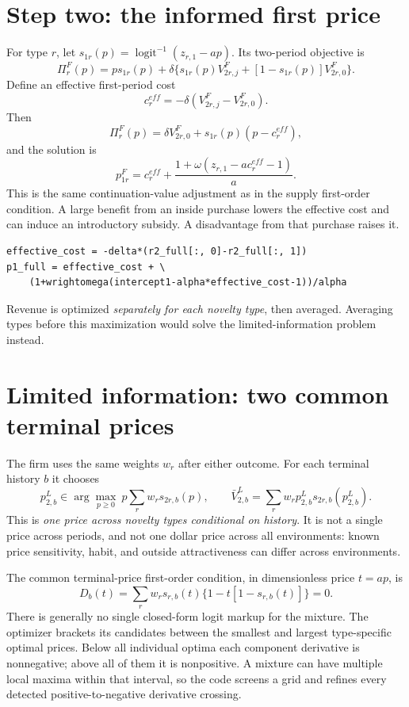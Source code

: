 \documentclass[11pt]{article}
\newcommand{\sig}{\operatorname{logit}^{-1}}
\begin{document}
\section{Step two: the informed first price}
For type $r$, let $s_{1r}(p)=\sig(z_{r,1}-ap)$. Its two-period objective is
\begin{equation}\label{eq:fullobj}
 \Pi^F_r(p)=p s_{1r}(p)+\delta\{s_{1r}(p)V^F_{2r,j}+[1-s_{1r}(p)]V^F_{2r,0}\}.
\end{equation}
Define an effective first-period cost
\[
 c^{eff}_r=-\delta(V^F_{2r,j}-V^F_{2r,0}).
\]
Then
\[
 \Pi^F_r(p)=\delta V^F_{2r,0}+s_{1r}(p)(p-c^{eff}_r),
\]
and the solution is
\begin{equation}\label{eq:p1full}
 p^F_{1r}=c^{eff}_r+
 \frac{1+\omega(z_{r,1}-a c^{eff}_r-1)}a.
\end{equation}
This is the same continuation-value adjustment as in the supply first-order condition. A large benefit from an inside purchase lowers the effective cost and can induce an introductory subsidy. A disadvantage from that purchase raises it.
\begin{lstlisting}
effective_cost = -delta*(r2_full[:, 0]-r2_full[:, 1])
p1_full = effective_cost + \
    (1+wrightomega(intercept1-alpha*effective_cost-1))/alpha
\end{lstlisting}
Revenue is optimized \emph{separately for each novelty type}, then averaged. Averaging types before this maximization would solve the limited-information problem instead.

\section{Limited information: two common terminal prices}
The firm uses the same weights $w_r$ after either outcome. For each terminal history $b$ it chooses
\begin{equation}\label{eq:common2}
 p^L_{2,b}\in\arg\max_{p\ge0}\ p\sum_r w_r s_{2r,b}(p),\qquad
 \bar V^L_{2,b}=\sum_rw_r p^L_{2,b}s_{2r,b}(p^L_{2,b}).
\end{equation}
This is \emph{one price across novelty types conditional on history}. It is not a single price across periods, and not one dollar price across all environments: known price sensitivity, habit, and outside attractiveness can differ across environments.

The common terminal-price first-order condition, in dimensionless price $t=ap$, is
\begin{equation}\label{eq:foccommon}
 D_b(t)=\sum_rw_r s_{r,b}(t)\{1-t[1-s_{r,b}(t)]\}=0.
\end{equation}
There is generally no single closed-form logit markup for the mixture. The optimizer brackets its candidates between the smallest and largest type-specific optimal prices. Below all individual optima each component derivative is nonnegative; above all of them it is nonpositive. A mixture can have multiple local maxima within that interval, so the code screens a grid and refines every detected positive-to-negative derivative crossing.
\end{document}
